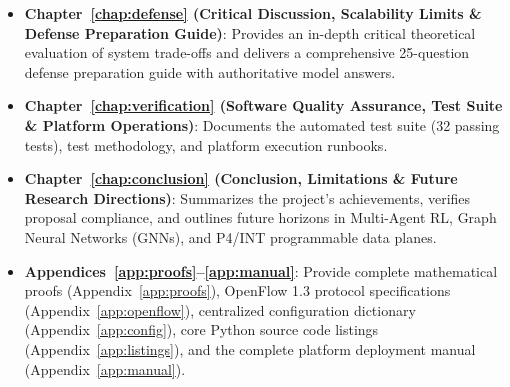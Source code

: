 \begin{itemize}
    \item \textbf{Chapter~\ref{chap:defense} (Critical Discussion, Scalability Limits \& Defense Preparation Guide)}: Provides an in-depth critical theoretical evaluation of system trade-offs and delivers a comprehensive 25-question defense preparation guide with authoritative model answers.
    \item \textbf{Chapter~\ref{chap:verification} (Software Quality Assurance, Test Suite \& Platform Operations)}: Documents the automated test suite (32 passing tests), test methodology, and platform execution runbooks.
    \item \textbf{Chapter~\ref{chap:conclusion} (Conclusion, Limitations \& Future Research Directions)}: Summarizes the project's achievements, verifies proposal compliance, and outlines future horizons in Multi-Agent RL, Graph Neural Networks (GNNs), and P4/INT programmable data planes.
    \item \textbf{Appendices~\ref{app:proofs}--\ref{app:manual}}: Provide complete mathematical proofs (Appendix~\ref{app:proofs}), OpenFlow 1.3 protocol specifications (Appendix~\ref{app:openflow}), centralized configuration dictionary (Appendix~\ref{app:config}), core Python source code listings (Appendix~\ref{app:listings}), and the complete platform deployment manual (Appendix~\ref{app:manual}).
\end{itemize}
